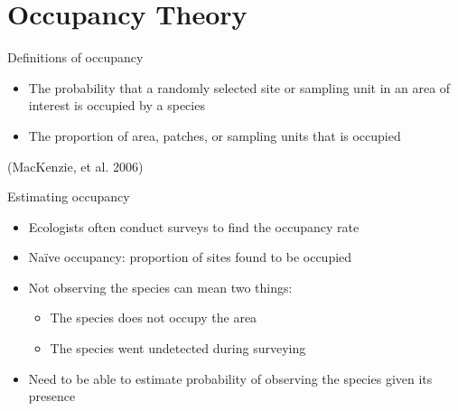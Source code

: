 \documentclass{beamer}
\begin{document}
\section{Occupancy Theory}
\begin{frame}{Definitions of occupancy}
	\begin{itemize}
		\item The probability that a randomly selected site or sampling unit in
		an area of interest is occupied by a species
		\item The proportion of area, patches, or sampling units that is
		occupied
	\end{itemize}
	(MacKenzie, et al. 2006)
	\begin{center}
	\end{center}
\end{frame}

\begin{frame}{Estimating occupancy}
	\begin{itemize}
		\item Ecologists often conduct surveys to find the occupancy rate
		\item Na\"ive occupancy: proportion of sites found to be occupied
		\item Not observing the species can mean two things:
		\begin{itemize}
			\item The species does not occupy the area
			\item The species went undetected during surveying
		\end{itemize}
		\item Need to be able to estimate probability of observing the species
		given its presence
	\end{itemize}
\end{frame}
\end{document}
